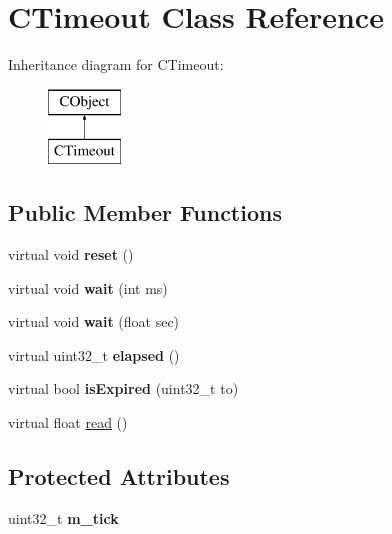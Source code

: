 \hypertarget{class_c_timeout}{\section{C\-Timeout Class Reference}
\label{class_c_timeout}
}
Inheritance diagram for C\-Timeout\-:\begin{figure}[H]
\begin{center}
\leavevmode
\includegraphics[height=2.000000cm]{class_c_timeout}
\end{center}
\end{figure}
\subsection*{Public Member Functions}
\begin{DoxyCompactItemize}
\item 
\hypertarget{class_c_timeout_a663a09bb51c1de8f8d83bd62fdc1a688}{virtual void {\bfseries reset} ()}\label{class_c_timeout_a663a09bb51c1de8f8d83bd62fdc1a688}

\item 
\hypertarget{class_c_timeout_a05315e59fa44ceafe8c9e444af0ac9e8}{virtual void {\bfseries wait} (int ms)}\label{class_c_timeout_a05315e59fa44ceafe8c9e444af0ac9e8}

\item 
\hypertarget{class_c_timeout_ab2edd08150efbd3ef36766c7e02f7792}{virtual void {\bfseries wait} (float sec)}\label{class_c_timeout_ab2edd08150efbd3ef36766c7e02f7792}

\item 
\hypertarget{class_c_timeout_a1858ddcad4e18f8056441072616a457f}{virtual uint32\-\_\-t {\bfseries elapsed} ()}\label{class_c_timeout_a1858ddcad4e18f8056441072616a457f}

\item 
\hypertarget{class_c_timeout_a3841c7c53689d2ef8559a6c5e402aa5b}{virtual bool {\bfseries is\-Expired} (uint32\-\_\-t to)}\label{class_c_timeout_a3841c7c53689d2ef8559a6c5e402aa5b}

\item 
virtual float \hyperlink{class_c_timeout_a8af3a09c9ed9172b37e930d05865cfac}{read} ()
\end{DoxyCompactItemize}
\subsection*{Protected Attributes}
\begin{DoxyCompactItemize}
\item 
\hypertarget{class_c_timeout_a70d74daffca8e29ae4682dae45bb9f8f}{uint32\-\_\-t {\bfseries m\-\_\-tick}}\label{class_c_timeout_a70d74daffca8e29ae4682dae45bb9f8f}

\end{DoxyCompactItemize}


